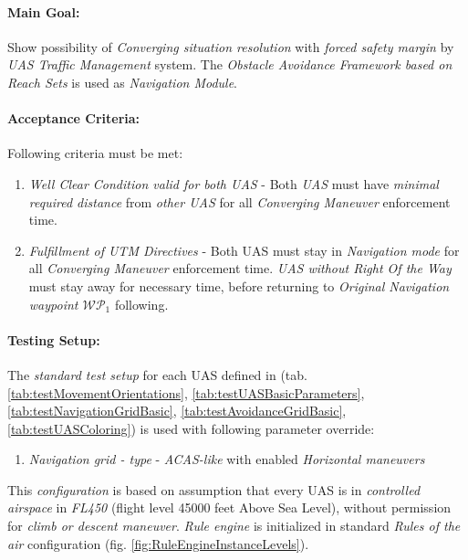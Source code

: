 \paragraph{Main Goal:} Show possibility of \emph{Converging situation resolution} with \emph{forced safety margin} by \emph{UAS Traffic Management} system.  The \emph{Obstacle Avoidance Framework based on Reach Sets} is used as \emph{Navigation Module}.

\paragraph{Acceptance  Criteria:} Following criteria must be met:

\begin{enumerate}
	\item \emph{Well Clear Condition valid for both UAS} - Both \emph{UAS} must have \emph{minimal required distance} from \emph{other UAS} for all \emph{Converging Maneuver} enforcement time.
	
	\item \emph{Fulfillment of UTM Directives} - Both UAS must stay in \emph{Navigation mode} for all \emph{Converging Maneuver} enforcement time. \emph{UAS without Right Of the Way} must stay away for necessary time, before returning to \emph{Original Navigation waypoint $\mathscr{WP}_1$} following.
\end{enumerate}


\paragraph{Testing Setup:} The \emph{standard test setup} for each UAS defined in (tab. \ref{tab:testMovementOrientations}, \ref{tab:testUASBasicParameters}, \ref{tab:testNavigationGridBasic}, \ref{tab:testAvoidanceGridBasic}, \ref{tab:testUASColoring}) is used with following parameter override:
\begin{enumerate}
	\item \emph{Navigation grid - type} - \emph{ACAS-like} with enabled \emph{Horizontal maneuvers}
\end{enumerate}

This \emph{configuration} is based on assumption that every UAS is in \emph{controlled airspace} in \emph{FL450} (flight level 45000 feet Above Sea Level), without permission for \emph{climb or descent maneuver}. \emph{Rule engine} is initialized in standard \emph{Rules of the air} configuration (fig. \ref{fig:RuleEngineInstanceLevels}).

